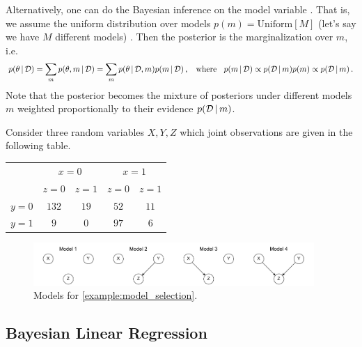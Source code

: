 Alternatively, one can do the Bayesian inference on the model variable .
That is, we assume the uniform distribution over models $p(m) = \text{Uniform}[M]$ (let's say we have $M$ different models) .
Then the posterior is the marginalization over $m$, i.e.
\begin{align}
    p(\theta\,|\, \mathcal{D}) = \sum_m p(\theta, m\,|\, \mathcal{D}) = \sum_m p(\theta\,|\, \mathcal{D}, m)p(m\,|\, \mathcal{D})\,, \;\;\text{ where }\;\; p(m\,|\, \mathcal{D}) \propto p(\mathcal{D}\,|\, m)p(m) \propto p(\mathcal{D}\,|\, m)\,.
\end{align}
Note that the posterior becomes the mixture of posteriors under different models $m$ weighted proportionally to their evidence $p(\mathcal{D}\,|\, m)$.

\begin{example}
    \label{example:model_selection}
    Consider three random variables $X,Y,Z$ which joint observations are given in the following table.\\
    \begin{center}
    \begin{tabular}{c|cc|cc}
        & \multicolumn{2}{c}{$x=0$} & \multicolumn{2}{c}{$x=1$}\\
         & $z=0$ & $z=1$ & $z=0$ & $z=1$ \\
        \midrule
        $y=0$ & $132$ & $19$ & $52$ & $11$ \\
        $y=1$ & $9$ & $0$ & $97$ & $6$
    \end{tabular}
    \end{center}
\end{example}

\begin{figure}[t]
    \centering
    \includegraphics[width=0.95\textwidth]{pics/xyz_models.pdf}
    \caption{Models for \cref{example:model_selection}.}
    \label{fig:xyz_models}
\end{figure}



\subsection{Bayesian Linear Regression}

